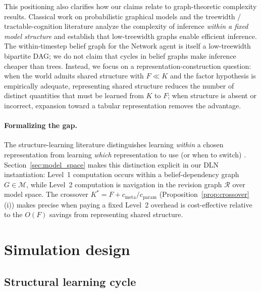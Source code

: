 \documentclass[11pt]{article}
\begin{document}
This positioning also clarifies how our claims relate to graph-theoretic complexity results.
Classical work on probabilistic graphical models \cite{Pearl1988} and the treewidth / tractable-cognition literature \cite{vanRooij2008,Kwisthout2010} analyze the complexity of inference \emph{within a fixed model structure} and establish that low-treewidth graphs enable efficient inference.
The within-timestep belief graph for the Network agent is itself a low-treewidth bipartite DAG; we do not claim that cycles in belief graphs make inference cheaper than trees.
Instead, we focus on a representation-construction question: when the world admits shared structure with $F\ll K$ and the factor hypothesis is empirically adequate, representing shared structure reduces the number of distinct quantities that must be learned from $K$ to $F$; when structure is absent or incorrect, expansion toward a tabular representation removes the advantage.

\paragraph{Formalizing the gap.}
The structure-learning literature distinguishes learning \emph{within} a chosen
representation from learning \emph{which} representation to use (or when to
switch) \cite{KempTenenbaum2008,CollinsFrank2013}.  Section~\ref{sec:model_space}
makes this distinction explicit in our DLN instantiation: Level~1 computation
occurs within a belief-dependency graph $G\in\mathcal{M}$, while Level~2
computation is navigation in the revision graph $\mathcal{R}$ over model space.
The crossover $K^* = F + c_{\mathrm{meta}}/c_{\mathrm{param}}$
(Proposition~\ref{prop:crossover}(i)) makes precise when paying a fixed Level~2
overhead is cost-effective relative to the $O(F)$ savings from representing
shared structure.




\section{Simulation design}

\subsection{Structural learning cycle}
\end{document}
